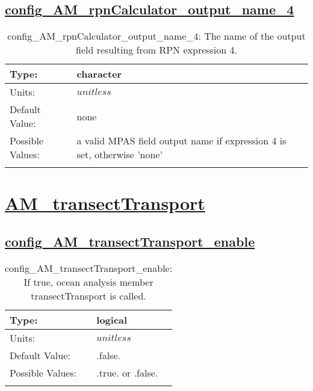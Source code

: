 \subsection[config\_AM\_rpnCalculator\_output\_name\_4]{\hyperref[sec:nm_tab_AM_rpnCalculator]{config\_AM\_rpnCalculator\_output\_name\_4}}
\label{subsec:nm_sec_config_AM_rpnCalculator_output_name_4}
\begin{center}
\begin{longtable}{| p{2.0in} || p{4.0in} |}
    \hline
    Type: & character \\
    \hline
    Units: & $unitless$ \\
    \hline
    Default Value: & none \\
    \hline
    Possible Values: & a valid MPAS field output name if expression 4 is set, otherwise 'none' \\
    \hline
    \caption{config\_AM\_rpnCalculator\_output\_name\_4: The name of the output field resulting from RPN expression 4.}
\end{longtable}
\end{center}
\section[AM\_transectTransport]{\hyperref[sec:nm_tab_AM_transectTransport]{AM\_transectTransport}}
\label{sec:nm_sec_AM_transectTransport}
\subsection[config\_AM\_transectTransport\_enable]{\hyperref[sec:nm_tab_AM_transectTransport]{config\_AM\_transectTransport\_enable}}
\label{subsec:nm_sec_config_AM_transectTransport_enable}
\begin{center}
\begin{longtable}{| p{2.0in} || p{4.0in} |}
    \hline
    Type: & logical \\
    \hline
    Units: & $unitless$ \\
    \hline
    Default Value: & .false. \\
    \hline
    Possible Values: & .true. or .false. \\
    \hline
    \caption{config\_AM\_transectTransport\_enable: If true, ocean analysis member transectTransport is called.}
\end{longtable}
\end{center}
